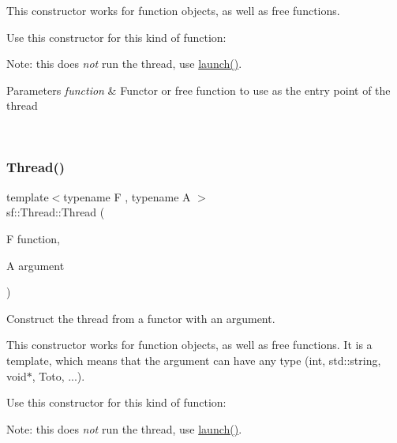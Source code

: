 This constructor works for function objects, as well as free functions.

Use this constructor for this kind of function\+: 
\begin{DoxyCode}{0}
\DoxyCodeLine{\textcolor{keywordtype}{void} \textcolor{keyword}{function}();}
\DoxyCodeLine{}
\DoxyCodeLine{\textcolor{comment}{// --- or ----}}
\DoxyCodeLine{}
\DoxyCodeLine{\{}
\DoxyCodeLine{\};}
\end{DoxyCode}
 Note\+: this does {\itshape not} run the thread, use \mbox{\hyperlink{classsf_1_1_thread_a74f75a9e86e1eb47479496314048b5f6}{launch()}}.


\begin{DoxyParams}{Parameters}
{\em function} & Functor or free function to use as the entry point of the thread \begin{DoxyVerb}\end{DoxyVerb}
 \\
\hline
\end{DoxyParams}
\mbox{\label{classsf_1_1_thread_a719b2cc067d92d52c35064a49d850a53}} 
\subsubsection{\texorpdfstring{Thread()}{Thread()}\hspace{0.1cm}{\footnotesize\ttfamily [2/3]}}
{\footnotesize\ttfamily template$<$typename F , typename A $>$ \\
sf\+::\+Thread\+::\+Thread (\begin{DoxyParamCaption}\item[{F}]{function,  }\item[{A}]{argument }\end{DoxyParamCaption})}



Construct the thread from a functor with an argument. 

This constructor works for function objects, as well as free functions. It is a template, which means that the argument can have any type (int, std\+::string, void$\ast$, Toto, ...).

Use this constructor for this kind of function\+: 
\begin{DoxyCode}{0}
\DoxyCodeLine{}
\DoxyCodeLine{\textcolor{comment}{// --- or ----}}
\DoxyCodeLine{}
\DoxyCodeLine{\{}
\DoxyCodeLine{\};}
\end{DoxyCode}
 Note\+: this does {\itshape not} run the thread, use \mbox{\hyperlink{classsf_1_1_thread_a74f75a9e86e1eb47479496314048b5f6}{launch()}}.



